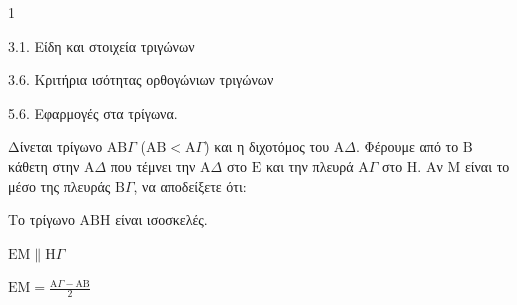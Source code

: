 \begin{ylh}{1}
    \item 3.1. Είδη και στοιχεία τριγώνων
    \item 3.6. Κριτήρια ισότητας ορθογώνιων τριγώνων
    \item 5.6. Εφαρμογές στα τρίγωνα.
\end{ylh}
Δίνεται τρίγωνο $\mathrm{A}\mathrm{B}\Gamma$ ($\mathrm{A}\mathrm{B} < \mathrm{A}\Gamma$) και η διχοτόμος του $\mathrm{A}\Delta$. Φέρουμε από το $\mathrm{B}$ κάθετη στην $\mathrm{A}\Delta$ που τέμνει την $\mathrm{A}\Delta$ στο $\mathrm{E}$ και την πλευρά $\mathrm{A}\Gamma$ στο $\mathrm{H}$. Αν $\mathrm{M}$ είναι το μέσο της πλευράς $\mathrm{B}\Gamma$, να αποδείξετε ότι:
\begin{alist}
    \item Το τρίγωνο $\mathrm{A}\mathrm{B}\mathrm{H}$ είναι ισοσκελές. 
    \item $\mathrm{E}\mathrm{M} \parallel \mathrm{H}\Gamma$ 
    \item $\mathrm{E}\mathrm{M} = \frac{\mathrm{A}\Gamma - \mathrm{A}\mathrm{B}}{2}$ 
\end{alist}
